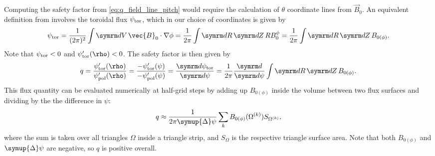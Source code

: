 Computing the safety factor from \cref{eq:q_field_line_pitch} would require the calculation of $\theta$ coordinate lines from $\vec{B}_{0}$. An equivalent definition from \textcite{dHaeseleer91} involves the toroidal flux $\psi_{\textrm{tor}}$, which in our choice of coordinates is given by
\begin{gather}
  \psi_{\tor} = \frac{1}{(2 \pi)^{2}} \int \diff V \, \vec{B}_{0} \cdot \grad \phi = \frac{1}{2 \pi} \int \diff R \, \diff Z \, R B_{0}^{\phi} = \frac{1}{2 \pi} \int \diff R \, \diff Z \, B_{0 (\phi)}.
\end{gather}
Note that $\psi_{\textrm{tor}} < 0$ and $\psi_{\tor}' (\rho) < 0$. The safety factor is then given by
\begin{gather}
  q = \frac{\psi_{\tor}' (\rho)}{\psi_{\pol}' (\rho)} = \frac{-\psi_{\tor}' (\psi)}{-\psi_{\pol}' (\psi)} = \td[\psi_{\tor}]{\psi} = \frac{1}{2 \pi} \td{\psi} \int \diff R \, \diff Z \, B_{0 (\phi)}.
\end{gather}
This flux quantity can be evaluated numerically at half-grid steps by adding up $B_{0 (\phi)}$ inside the volume between two flux surfaces and dividing by the the difference in $\psi$:
\begin{gather}
  q \approx \frac{1}{2 \pi \symup{\Delta} \psi} \sum_{k} B_{0 (\phi)} (\Omega^{(k)}) S_{\Omega^{(k)}}, \label{eq:q-impl}
\end{gather}
where the sum is taken over all triangles $\Omega$ inside a triangle strip, and $S_{\Omega}$ is the respective triangle surface area. Note that both $B_{0 (\phi)}$ and $\symup{\Delta} \psi$ are negative, so $q$ is positive overall.

